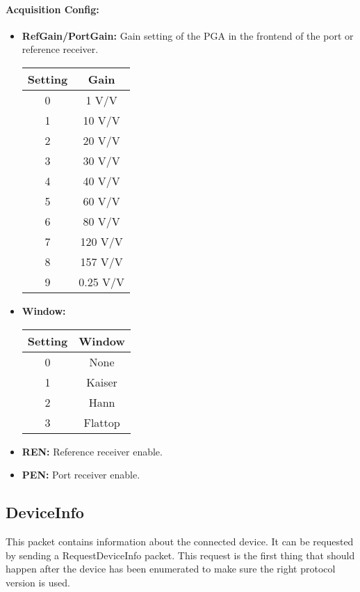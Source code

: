 \documentclass[a4paper,11pt]{article}
\newcommand{\bitrect}[2]{
  \begin{pgfonlayer}{foreground}
    \draw [thick] (0,0) rectangle (#1,1);
    \pgfmathsetmacro\result{#1-1}
    \foreach \x in {1,...,\result}
      \draw [thick] (\x,1) -- (\x, 0.8);
  \end{pgfonlayer}
  \bitlabels{#1}{#2}
}
\newcommand{\rwbits}[3]{
  \draw [thick] (#1,0) rectangle ++(#2,1) node[pos=0.5]{#3};
  \pgfmathsetmacro\start{#1+0.5}
  \pgfmathsetmacro\finish{#1+#2-0.5}
}
\newcommand{\robits}[3]{
  \begin{pgfonlayer}{background}
    \draw [thick, fill=lightgray] (#1,0) rectangle ++(#2,1) node[pos=0.5]{#3};
  \end{pgfonlayer}
  \pgfmathsetmacro\start{#1+0.5}
  \pgfmathsetmacro\finish{#1+#2-0.5}
}
\newcommand{\bitlabels}[2]{
  \foreach \bit in {1,...,#1}{
     \pgfmathsetmacro\result{#2}
     \node [above] at (\bit-0.5, 1) {\pgfmathprintnumber{\result}};
   }
}
\begin{document}
\paragraph{Acquisition Config:}
\begin{center}
\end{center}
\begin{itemize}
\item \textbf{RefGain/PortGain:} Gain setting of the PGA in the frontend of the port or reference receiver.
\begin{center}
\begin{tabular}{ c|c }
Setting & Gain\\
 \hline
0 & 1 V/V \\
1 & 10 V/V\\
2 & 20 V/V\\
3 & 30 V/V\\
4 & 40 V/V\\
5 & 60 V/V\\
6 & 80 V/V\\
7 & 120 V/V\\
8 & 157 V/V\\
9 & 0.25 V/V\\
\end{tabular}
\end{center}
\item \textbf{Window:}
\begin{center}
\begin{tabular}{ c|c }
Setting & Window\\
 \hline
0 & None \\
1 & Kaiser\\
2 & Hann\\
3 & Flattop\\
\end{tabular}
\end{center}
\item \textbf{REN:} Reference receiver enable.
\item \textbf{PEN:} Port receiver enable.
\end{itemize}

\subsection{DeviceInfo}
This packet contains information about the connected device. It can be requested by sending a RequestDeviceInfo packet. This request is the first thing that should happen after the device has been enumerated to make sure the right protocol version is used.
\end{document}
